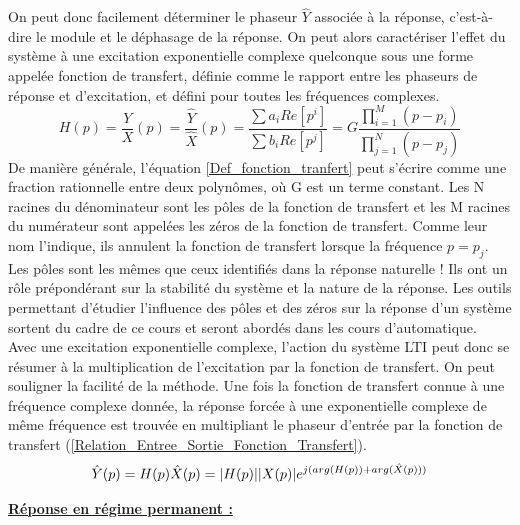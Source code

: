 \begin{remark}{}
	On peut donc facilement déterminer le phaseur $\hat{Y}$
        associée à la réponse, c'est-à-dire le module et le déphasage
        de la réponse.  On peut alors caractériser l'effet du système
        à une excitation exponentielle complexe quelconque sous une
        forme appelée fonction de transfert, définie comme le rapport
        entre les phaseurs de réponse et d'excitation, et défini pour
        toutes les fréquences complexes.
	\begin{equation}\label{Def_fonction_tranfert}
          H(p) = \frac{Y}{X} (p) = \frac{\hat Y}{\hat X} (p)= \frac{\sum a_{i}  Re[p^{i}]}{\sum b_{i}  Re[p^{j}]}=G\frac{\prod_{i=1}^{M} (p-p_{i})}{\prod_{j=1}^{N} (p-p_{j})}
	\end{equation}
	De manière générale, l'équation \ref{Def_fonction_tranfert} peut s'écrire comme une fraction rationnelle entre deux polynômes, où G est un terme constant. Les N racines du dénominateur sont les pôles de la fonction de transfert et les M racines du numérateur sont appelées les zéros de la fonction de transfert. Comme leur nom l'indique, ils annulent la fonction de transfert lorsque la fréquence $p=p_{j}$. Les pôles sont les mêmes que ceux identifiés dans la réponse naturelle ! Ils ont un rôle prépondérant sur la stabilité du système et la nature de la réponse. Les outils permettant d'étudier l'influence des pôles et des zéros sur la réponse d'un système sortent du cadre de ce cours et seront abordés dans les cours d'automatique.\\
	
	Avec une excitation exponentielle complexe, l'action du
        système LTI peut donc se résumer à la multiplication de
        l'excitation par la fonction de transfert.  On peut souligner
        la facilité de la méthode. Une fois la fonction de transfert
        connue à une fréquence complexe donnée, la réponse forcée à
        une exponentielle complexe de même fréquence est trouvée en
        multipliant le phaseur d'entrée par la fonction de transfert
        (\ref{Relation_Entree_Sortie_Fonction_Transfert}).
	\begin{equation}\label{Relation_Entree_Sortie_Fonction_Transfert}
          \hat{Y}(p) = H(p) \hat{X}(p)=|H(p)||X(p)|e^{j(arg(H(p))+arg(\hat{X}(p)))}	
	\end{equation}
	
	\vspace{1\baselineskip}
	
	
	\textbf{\underline{Réponse en régime permanent :} }
	

\end{remark}
